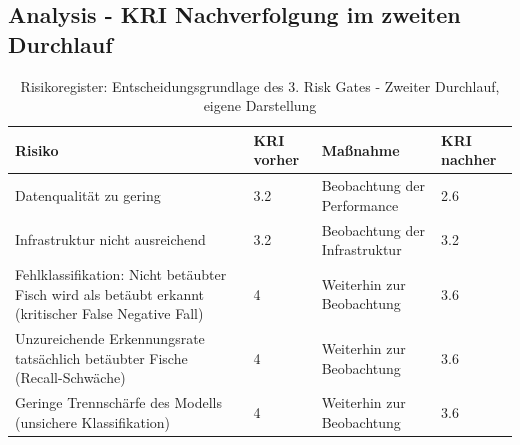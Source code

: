 \subsection{Analysis - KRI Nachverfolgung im zweiten Durchlauf} 
\label{appendix:cs3_phase3_risiko_verfolgung_2}
\begin{table}[H]
    \label{tab:cs3_phase3_risiko_verfolgung_tabelle_2}
    \centering
    \renewcommand{\arraystretch}{1.3}
    \begin{tabular}{|p{3cm}|p{3cm}|p{3cm}|p{3cm}|}
    \hline
    \textbf{Risiko} & \textbf{KRI vorher} & \textbf{Maßnahme} & \textbf{KRI nachher} \\
    \hline

    Datenqualität zu gering
    & 3.2
    & Beobachtung der Performance
    & 2.6 \\
    \hline

    Infrastruktur nicht ausreichend 
    & 3.2
    & Beobachtung der Infrastruktur
    & 3.2 \\
    \hline

    Fehlklassifikation: Nicht betäubter Fisch wird als betäubt erkannt (kritischer False Negative Fall) 
    & 4
    & Weiterhin zur Beobachtung
    & 3.6  \\
    \hline

    Unzureichende Erkennungsrate tatsächlich betäubter Fische (Recall-Schwäche)
    & 4
    & Weiterhin zur Beobachtung
    & 3.6  \\
    \hline

    Geringe Trennschärfe des Modells (unsichere Klassifikation)
    & 4
    & Weiterhin zur Beobachtung
    & 3.6  \\
    \hline

    \end{tabular}
    \caption{Risikoregister: Entscheidungsgrundlage des 3. Risk Gates - Zweiter Durchlauf, eigene Darstellung}
\end{table}



\clearpage %

